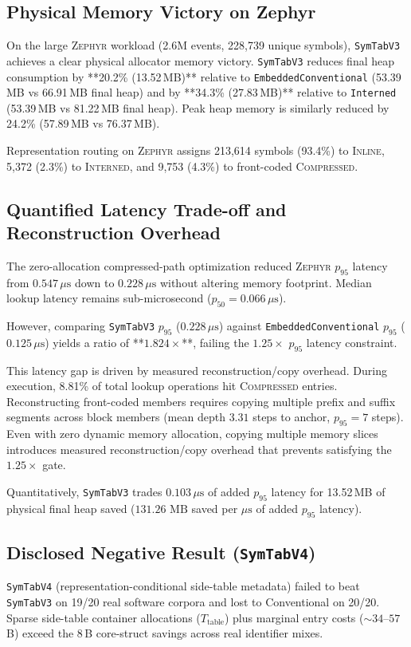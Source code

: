 \documentclass[conference]{IEEEtran}
\begin{document}
\subsection{Physical Memory Victory on Zephyr}
On the large \textsc{Zephyr} workload (2.6M events, 228,739 unique symbols), \texttt{SymTabV3} achieves a clear physical allocator memory victory. \texttt{SymTabV3} reduces final heap consumption by **20.2\% (13.52\,MB)** relative to \texttt{EmbeddedConventional} (53.39\,MB vs 66.91\,MB final heap) and by **34.3\% (27.83\,MB)** relative to \texttt{Interned} (53.39\,MB vs 81.22\,MB final heap). Peak heap memory is similarly reduced by 24.2\% (57.89\,MB vs 76.37\,MB).

Representation routing on \textsc{Zephyr} assigns 213,614 symbols (93.4\%) to \textsc{Inline}, 5,372 (2.3\%) to \textsc{Interned}, and 9,753 (4.3\%) to front-coded \textsc{Compressed}.

\subsection{Quantified Latency Trade-off and Reconstruction Overhead}
The zero-allocation compressed-path optimization reduced \textsc{Zephyr} $p_{95}$ latency from $0.547\,\mu\text{s}$ down to $0.228\,\mu\text{s}$ without altering memory footprint. Median lookup latency remains sub-microsecond ($p_{50} = 0.066\,\mu\text{s}$).

However, comparing \texttt{SymTabV3} $p_{95}$ ($0.228\,\mu\text{s}$) against \texttt{EmbeddedConventional} $p_{95}$ ($0.125\,\mu\text{s}$) yields a ratio of **$1.824\times$**, failing the $1.25\times$ $p_{95}$ latency constraint.

This latency gap is driven by measured reconstruction/copy overhead. During execution, 8.81\% of total lookup operations hit \textsc{Compressed} entries. Reconstructing front-coded members requires copying multiple prefix and suffix segments across block members (mean depth $3.31$ steps to anchor, $p_{95} = 7$ steps). Even with zero dynamic memory allocation, copying multiple memory slices introduces measured reconstruction/copy overhead that prevents satisfying the $1.25\times$ gate.

Quantitatively, \texttt{SymTabV3} trades $0.103\,\mu\text{s}$ of added $p_{95}$ latency for 13.52\,MB of physical final heap saved ($131.26\text{ MB}$ saved per $\mu\text{s}$ of added $p_{95}$ latency).

\subsection{Disclosed Negative Result (\texttt{SymTabV4})}
\texttt{SymTabV4} (representation-conditional side-table metadata) failed to beat \texttt{SymTabV3} on 19/20 real software corpora and lost to Conventional on 20/20. Sparse side-table container allocations ($T_{\text{table}}$) plus marginal entry costs ($\sim 34\text{--}57$\,B) exceed the 8\,B core-struct savings across real identifier mixes.
\end{document}
